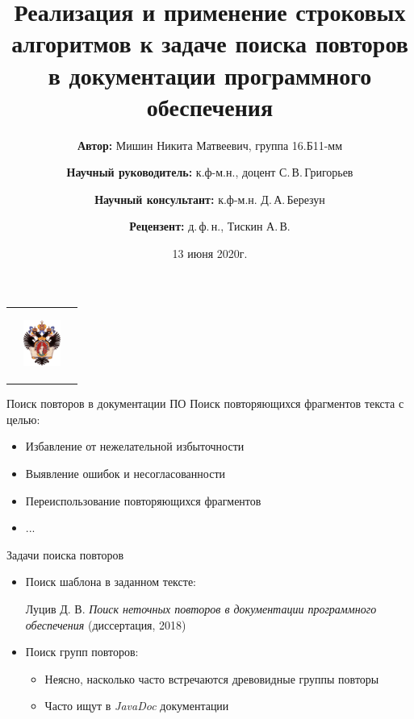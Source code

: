 \documentclass[xcolor=table]{beamer}
\title[Реализация и применение алгоритмов]{\large{Реализация и применение строковых алгоритмов к задаче поиска повторов в документации программного обеспечения}}
\institute[СПбГУ]{
Санкт-Петербургский государственный университет \\
Кафедра системного программирования }
\author[Никита Мишин]{\scriptsize{{\bfseries Автор:} Мишин Никита Матвеевич, группа 16.Б11-мм}\\ \vfill
  \and  
    {\scriptsize{\bfseries Научный руководитель:} к.ф-м.н., доцент С.\,В.\,Григорьев}\\
	\and
	{\scriptsize{\bfseries Научный консультант:} к.ф-м.н. Д.\,А.\,Березун}\\
	\and
	{\scriptsize{\bfseries Рецензент:} д.\,ф.\,н., Тискин А.\,В.}
	}
\date{13 июня 2020г.}
\begin{document}
{
\begin{frame}[fragile]
  \begin{tabular}{p{2.0cm} p{7.5cm} p{1cm}}
   \begin{center}
    \end{center}
    &
    \begin{center}
    \includegraphics[height=1.5cm]{pictures/SPbGU_Logo.png}
    \end{center}
    &
    \begin{flushright}
    \end{flushright}
  \end{tabular}
  \titlepage
  \thispagestyle{empty}
\end{frame}
}


\begin{frame}{ Поиск повторов в документации ПО}
    Поиск повторяющихся фрагментов текста с целью:
    \begin{itemize}
    \vfill\item Избавление от нежелательной избыточности
    \vfill\item Выявление ошибок и несогласованности
    \vfill\item Переиспользование повторяющихся фрагментов

    \vfill\item ...
    \end{itemize}
\end{frame}


\begin{frame}{Задачи поиска повторов}
\begin{itemize}
    \vfill\item Поиск шаблона в заданном тексте:
     \begin{flushright} Луцив Д. В. \emph{Поиск неточных повторов в документации программного обеспечения} (диссертация, 2018)  
    \end{flushright}
    \vfill\item Поиск групп повторов:
    \begin{itemize}
        \vfill\item Неясно, насколько часто встречаются древовидные группы повторы
        \vfill\item Часто ищут в \emph{JavaDoc} документации
    \end{itemize}
\end{itemize}
\end{frame}
\end{document}
